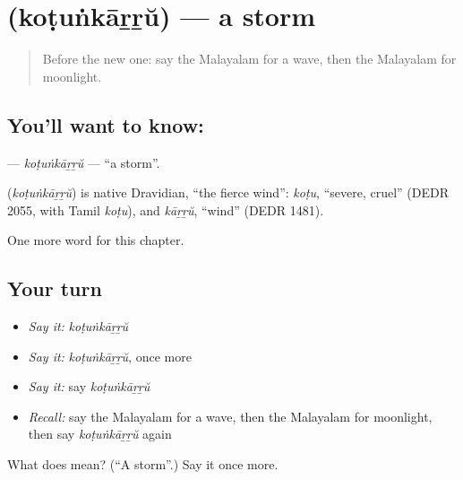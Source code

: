 \section[\texorpdfstring{\ml{കൊടുങ്കാറ്റ്} (koṭuṅkāṟṟŭ)}{കൊടുങ്കാറ്റ് (koṭuṅkāṟṟŭ)}]{ (koṭuṅkāṟṟŭ) — a storm}

\label{lesson:ML-C292-kotunkarru}



\begin{quote}
Before the new one: say the Malayalam for a wave, then the Malayalam for moonlight.
\end{quote}

\subsection*{You'll want to know: }
\textbf{} — \emph{koṭuṅkāṟṟŭ} — \textquotedblleft{}a storm\textquotedblright{}.

\begin{cousinweb}
\textbf{} (\emph{koṭuṅkāṟṟŭ}) is native Dravidian, \textquotedblleft{}the fierce wind\textquotedblright{}: \emph{koṭu}, \textquotedblleft{}severe, cruel\textquotedblright{} (DEDR 2055, with Tamil \emph{koṭu}), and \emph{kāṟṟŭ}, \textquotedblleft{}wind\textquotedblright{} (DEDR 1481).
\end{cousinweb}

\begin{grammarlens}[title={What you've built}]
One more word for this chapter.
\end{grammarlens}

\subsection*{Your turn}
\begin{itemize}
\raggedright
  \item \emph{Say it:} \emph{koṭuṅkāṟṟŭ}
  \item \emph{Say it:} \emph{koṭuṅkāṟṟŭ}, once more
  \item \emph{Say it:} say \emph{koṭuṅkāṟṟŭ}
  \item \emph{Recall:} say the Malayalam for a wave, then the Malayalam for moonlight, then say \emph{koṭuṅkāṟṟŭ} again
\end{itemize}

\begin{tcolorbox}[breakable,colback=teal!4,colframe=teal!35!black,title={Before you move on}]
What does  mean? (\textquotedblleft{}A storm\textquotedblright{}.) Say it once more.
\end{tcolorbox}
